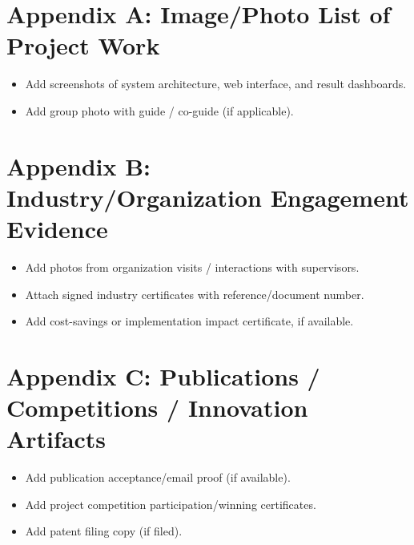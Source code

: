 \documentclass[12pt,a4paper]{report}
\begin{document}
\section*{Appendix A: Image/Photo List of Project Work}
\begin{itemize}[leftmargin=1.5em]
\item Add screenshots of system architecture, web interface, and result dashboards.
\item Add group photo with guide / co-guide (if applicable).
\end{itemize}

\section*{Appendix B: Industry/Organization Engagement Evidence}
\begin{itemize}[leftmargin=1.5em]
\item Add photos from organization visits / interactions with supervisors.
\item Attach signed industry certificates with reference/document number.
\item Add cost-savings or implementation impact certificate, if available.
\end{itemize}

\section*{Appendix C: Publications / Competitions / Innovation Artifacts}
\begin{itemize}[leftmargin=1.5em]
\item Add publication acceptance/email proof (if available).
\item Add project competition participation/winning certificates.
\item Add patent filing copy (if filed).
\end{itemize}
\end{document}

